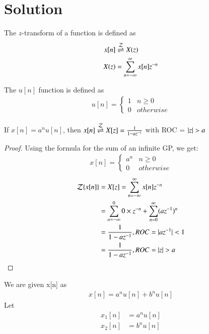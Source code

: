 \documentclass[journal,12pt,twocolumn]{IEEEtran}
\begin{document}
\section*{Solution}
\begin{definition}\label{def:z}
    The $z$-transform of a function is defined as
    \begin{align}
        x[n] &\overset{\mathcal{Z}}{ \rightleftharpoons} X(z)\\
        X(z) &=\sum_{n=-\infty}^{\infty} x[n]z^{-n}
    \end{align}
\end{definition}
\begin{definition}\label{def:u_n}
    The $u[n]$ function is defined as
    \begin{align}
        u[n] = 
        \begin{cases}
        1 & n\geq0\\
        0 & otherwise
        \end{cases}
    \end{align}
\end{definition}
\begin{lemma}
If $x[n] = a^nu[n]$, then $x[n] \overset{\mathcal{Z}}{ \rightleftharpoons} X[z] = \frac{1}{1 - az^{-1}}$ with ROC = $\vert z\vert>a$
\label{0}
\end{lemma}
\begin{proof}
Using the formula for the sum of an infinite GP, we get:
\begin{align}
    x[n] = 
    \begin{cases}
    a^n & n\geq 0\\
    0 & otherwise
    \end{cases}
\end{align}
\begin{align}
    \mathcal{Z}\{x[n]\} &= X[z] = \sum_{n = -\infty}^\infty x[n]z^{-n}\\
    &= \sum_{n = -\infty}^0 0 \times z^{-n} + \sum_{n = 0}^{\infty} (az^{-1})^n\\
    &= \frac{1}{1 - az^{-1}} , ROC = \vert az^{-1}\vert < 1\\
    &= \frac{1}{1 - az^{-1}} , ROC =  \vert z\vert > a
\end{align}
\end{proof}
We are given x[n] as
\begin{align}
    x[n]=a^nu[n]+b^nu[n]
\end{align}
Let
\begin{align}
    x_1[n]&=a^nu[n]\\
    x_2[n]&=b^nu[n]
\end{align}
\end{document}
